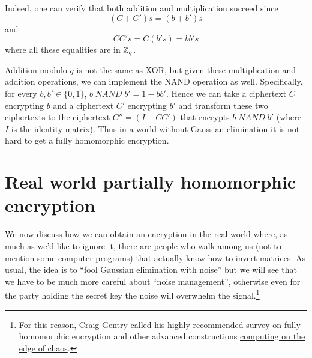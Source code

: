 Indeed, one can verify that both addition and multiplication succeed
since
\begin{equation*}
(C+C')s = (b+b')s
\end{equation*}
and
\begin{equation*}
\ensuremath{\mathit{CC}}'s = C(b's) = bb's
\end{equation*}
where all these equalities are in \({\mathbb{Z}}_q\).

Addition modulo \(q\) is not the same as XOR, but given these
multiplication and addition operations, we can implement the NAND
operation as well. Specifically, for every \(b,b' \in \{0,1\}\),
\(b \; \ensuremath{\mathit{NAND}} \; b' = 1-bb'\). Hence we can take a
ciphertext \(C\) encrypting \(b\) and a ciphertext \(C'\) encrypting
\(b'\) and transform these two ciphertexts to the ciphertext
\(C''=(I-CC')\) that encrypts \(b\; \ensuremath{\mathit{NAND}} \; b'\)
(where \(I\) is the identity matrix). Thus in a world without Gaussian
elimination it is not hard to get a fully homomorphic encryption.

\hypertarget{privkeyfhe}{}

\section{Real world partially homomorphic
encryption}\label{17-Real-world-partially-h}

We now discuss how we can obtain an encryption in the real world where,
as much as we'd like to ignore it, there are people who walk among us
(not to mention some computer programs) that actually know how to invert
matrices. As usual, the idea is to ``fool Gaussian elimination with
noise'' but we will see that we have to be much more careful about
``noise management'', otherwise even for the party holding the secret
key the noise will overwhelm the signal.\footnote{For this reason, Craig
  Gentry called his highly recommended survey on fully homomorphic
  encryption and other advanced constructions
  \href{https://eprint.iacr.org/2014/610}{computing on the edge of
  chaos}.}

